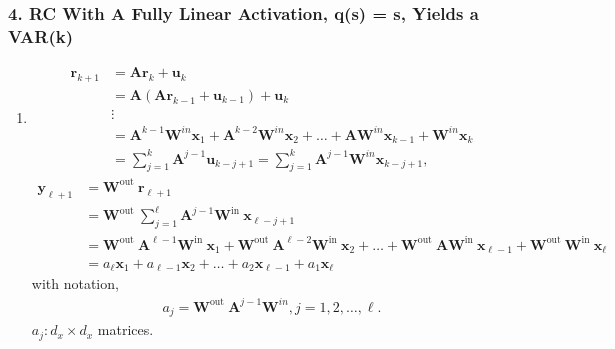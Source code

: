 \subsubsection{4. RC With A Fully Linear Activation, q(s) = s, Yields a VAR(k)
}\label{Bollt4}
\begin{enumerate}
    \item 
    \begin{equation}
        \begin{aligned}
        \mathbf{r}_{k+1} & =\mathbf{A} \mathbf{r}_k+\mathbf{u}_k \\
        & =\mathbf{A}\left(\mathbf{A} \mathbf{r}_{k-1}+\mathbf{u}_{k-1}\right)+\mathbf{u}_k \\
        & \vdots \\
        & =\mathbf{A}^{k-1} \mathbf{W}^{i n} \mathbf{x}_1+\mathbf{A}^{k-2} \mathbf{W}^{i n} \mathbf{x}_2+\ldots+\mathbf{A} \mathbf{W}^{i n} \mathbf{x}_{k-1}+\mathbf{W}^{i n} \mathbf{x}_k \\
        & =\sum_{j=1}^k \mathbf{A}^{j-1} \mathbf{u}_{k-j+1}=\sum_{j=1}^k \mathbf{A}^{j-1} \mathbf{W}^{i n} \mathbf{x}_{k-j+1},
        \end{aligned}
        \end{equation}
        \begin{equation}
    \begin{aligned}\label{data_prediction}
    \mathbf{y}_{\ell+1} & =\mathbf{W}^{\text {out }} \mathbf{r}_{\ell+1} \\
    & =\mathbf{W}^{\text {out }} \sum_{j=1}^{\ell} \mathbf{A}^{j-1} \mathbf{W}^{\text {in }} \mathbf{x}_{\ell-j+1} \\
    & =\mathbf{W}^{\text {out }} \mathbf{A}^{\ell-1} \mathbf{W}^{\text {in }} \mathbf{x}_1+\mathbf{W}^{\text {out }} \mathbf{A}^{\ell-2} \mathbf{W}^{\text {in }} \mathbf{x}_2+\ldots+\mathbf{W}^{\text {out }} \mathbf{A} \mathbf{W}^{\text {in }} \mathbf{x}_{\ell-1}+\mathbf{W}^{\text {out }} \mathbf{W}^{\text {in }} \mathbf{x}_{\ell} \\
    & =a_{\ell} \mathbf{x}_1+a_{\ell-1} \mathbf{x}_2+\ldots+a_2 \mathbf{x}_{\ell-1}+a_1 \mathbf{x}_{\ell}
    \end{aligned}
    \end{equation}
    with notation,
    \begin{equation}
    \begin{aligned}
    a_j=\mathbf{W}^{\text {out }} \mathbf{A}^{j-1} \mathbf{W}^{i n}, j=1,2, \ldots, \ell .
    \end{aligned}
    \end{equation}
    $a_j : d_x \times d_x$ matrices.
    

\end{enumerate}
